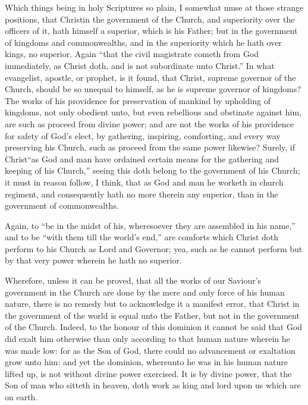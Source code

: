 Which things being in holy Scriptures so plain, I somewhat muse at those strange positions, that Christin the government of the Church, and superiority over the officers of it, hath himself a superior, which is his Father; but in the government of kingdoms and commonwealths, and in the superiority which he hath over kings, no superior. Again “that the civil magistrate cometh from God immediately, as Christ doth, and is not subordinate unto Christ.” In what evangelist, apostle, or prophet, is it found, that Christ, supreme governor of the Church, should be so unequal to himself, as he is supreme governor of kingdoms? The works of his providence for preservation of mankind by upholding of kingdoms, not only obedient unto, but even rebellious and obstinate against him, are such as proceed from divine power; and are not the works of his providence for safety of God’s elect, by gathering, inspiring, comforting, and every way preserving his Church, such as proceed from the same power likewise? Surely, if Christ“as God and man have ordained certain means for the gathering and keeping of his Church,” seeing this doth belong to the government of his Church; it must in reason follow, I think, that as God and man he worketh in church regiment, and consequently hath  no more therein any superior, than in the government of commonwealths.

Again, to “be in the midst of his, wheresoever they are assembled in his name,” and to be “with them till the world’s end,” are comforts which Christ doth perform to his Church as Lord and Governor; yea, such as he cannot perform but by that very power wherein he hath no superior.

Wherefore, unless it can be proved, that all the works of our Saviour’s government in the Church are done by the mere and only force of his human nature, there is no remedy but to acknowledge it a manifest error, that Christ in the government of the world is equal unto the Father, but not in the government of the Church. Indeed, to the honour of this dominion it cannot be said that God did exalt him otherwise than only according to that human nature wherein he was made low: for as the Son of God, there could no advancement or exaltation grow unto him: and yet the dominion, whereunto he was in his human nature lifted up, is not without divine power exercised. It is by divine power, that the Son of man who sitteth in heaven, doth work as king and lord upon us which are on earth.

